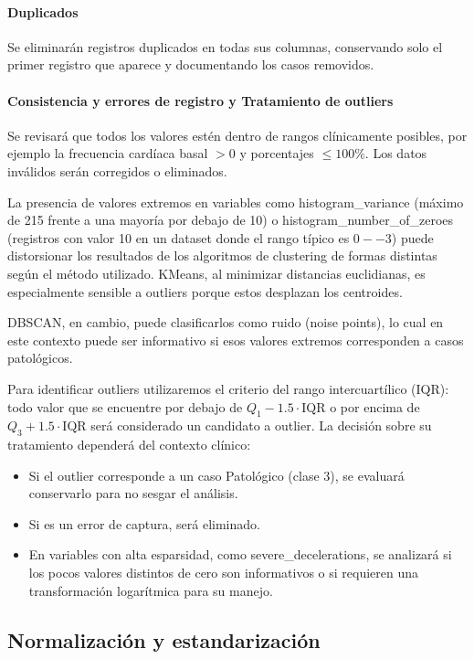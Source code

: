 \documentclass[12pt,letterpaper]{article}
\begin{document}
\paragraph{Duplicados}
Se eliminarán registros duplicados  en todas sus columnas, conservando solo el primer registro que aparece y documentando los casos removidos.

\paragraph{Consistencia y errores de registro y Tratamiento de outliers}
Se revisará que todos los valores estén dentro de rangos clínicamente posibles, por ejemplo la frecuencia cardíaca basal $>0$ y porcentajes $≤100\%$. Los datos inválidos serán corregidos o eliminados.

La presencia de valores extremos en variables como histogram\_variance (máximo de 215 frente a una
mayoría por debajo de 10) o histogram\_number\_of\_zeroes (registros con valor 10 en un dataset
donde el rango típico es $0--3$) puede distorsionar los resultados de los algoritmos de clustering
de formas distintas según el método utilizado. K\-Means, al minimizar distancias euclidianas, es
especialmente sensible a outliers porque estos desplazan los centroides.

DBSCAN, en cambio, puede clasificarlos como ruido (noise points), lo cual en este contexto puede
ser informativo si esos valores extremos corresponden a casos patológicos.

Para identificar outliers utilizaremos el criterio del rango intercuartílico (IQR): todo valor que
se encuentre por debajo de $Q_1 - 1.5 \cdot \text{IQR}$ o por encima de
$Q_3 + 1.5 \cdot \text{IQR}$ será considerado un candidato a outlier. La decisión sobre su
tratamiento dependerá del contexto clínico:

\begin{itemize}[leftmargin=2em, itemsep=4pt]
  \item Si el outlier corresponde a un caso Patológico (clase 3), se evaluará conservarlo para no sesgar el análisis.
  \item Si es un error de captura, será eliminado.
  \item En variables con alta esparsidad, como severe\_decelerations, se analizará si los pocos valores distintos de cero son informativos o si requieren una transformación logarítmica para su manejo.
\end{itemize}

\subsection{Normalización y estandarización}
\end{document}
